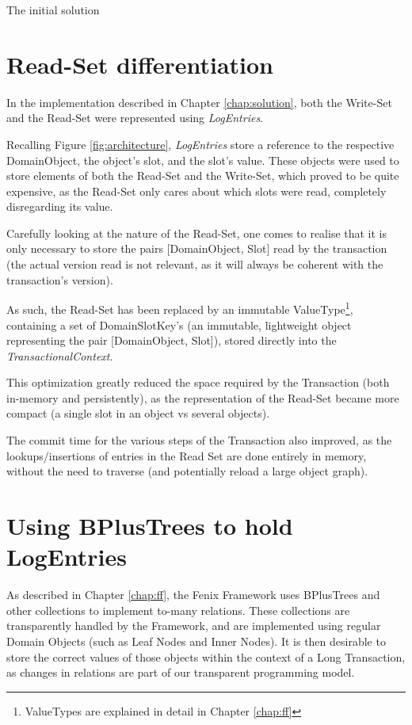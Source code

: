 The initial solution 


\section{Read-Set differentiation}

In the implementation described in Chapter \ref{chap:solution}, both
the Write-Set and the Read-Set were represented using {\it LogEntries}.

Recalling Figure \ref{fig:architecture}, {\it LogEntries} store a
reference to the respective DomainObject, the object's slot, and the
slot's value. These objects were used to store elements of both the
Read-Set and the Write-Set, which proved to be quite expensive, as the
Read-Set only cares about which slots were read, completely
disregarding its value.

Carefully looking at the nature of the Read-Set, one comes to realise
that it is only necessary to store the pairs [DomainObject, Slot] read
by the transaction (the actual version read is not relevant, as it
will always be coherent with the transaction's version).


As such, the Read-Set has been replaced by an immutable
ValueType\footnote{ValueTypes are explained in detail in Chapter
  \ref{chap:ff}}, containing a set of DomainSlotKey's (an immutable,
lightweight object representing the pair [DomainObject, Slot]), stored
directly into the {\it TransactionalContext}.

This optimization greatly reduced the space required by the
Transaction (both in-memory and persistently), as the representation
of the Read-Set became more compact (a single slot in an object vs
several objects).

The commit time for the various steps of the Transaction also
improved, as the lookups/insertions of entries in the Read Set are
done entirely in memory, without the need to traverse (and
potentially reload a large object graph).

\section{Using BPlusTrees to hold LogEntries}

As described in Chapter \ref{chap:ff}, the Fenix Framework uses
BPlusTrees and other collections to implement to-many relations. These
collections are transparently handled by the Framework, and are
implemented using regular Domain Objects (such as Leaf Nodes and Inner
Nodes). It is then desirable to store the correct values of those
objects within the context of a Long Transaction, as changes in
relations are part of our transparent programming model.

